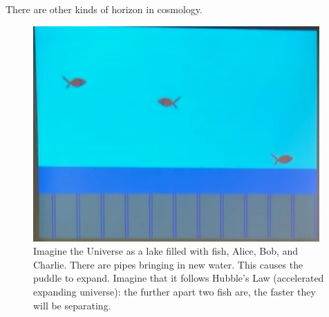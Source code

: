 \documentclass[]{article}
\begin{document}
There are other kinds of horizon in cosmology.

\begin{figure}[H]
	\caption[Imagine the Universe as a lake filled with fish]{Imagine the Universe as a lake filled with fish, Alice, Bob, and Charlie. There are pipes bringing in new water. This causes the puddle to expand. Imagine that it follows Hubble's Law (accelerated expanding universe): the further apart two fish are, the faster they will be separating. }
	\includegraphics{wh-cosmology-fish}
\end{figure}
\end{document}
